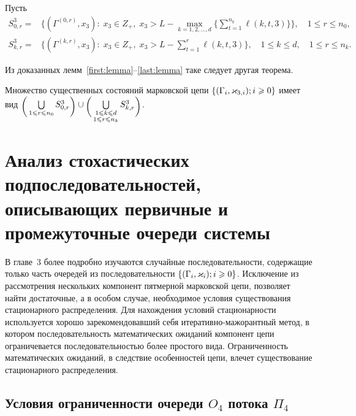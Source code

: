 \documentclass{report}
\newcommand{\Mark}{\{(\Gamma_i, \varkappa_i); \hm{} i \geqslant 0\}}
\newcommand{\MarkThree}{\{(\Gamma_i, \varkappa_{3,i}); \hm{} i \geqslant 0\}}
\begin{document}
Пусть
\begin{align*}
  S^3_{0,r} = & 
  \biggl\{
  (\Gamma^{(0,r)},x_3) \colon \; x_3\in Z_+,\; x_3 > L - \max\limits_{k=1, 2,
    \ldots, d}
  \biggl\{ \sum_{t=1}^{n_k} \ell({k,t,3}) \biggl\}\biggl\}, 
  \quad 1 \leqslant r \leqslant n_0, \\
  S^3_{k,r} = & 
  \biggl\{
  (\Gamma^{(k,r)},x_3) \colon \; x_3\in Z_+,\; x_3 > L - \sum_{t=1}^{r} \ell({k,t,3})
  \biggr\}, 
  \quad 1 \leqslant k \leqslant d, \quad 1 \leqslant r \leqslant n_k.
\end{align*}

Из доказанных лемм~\ref{first:lemma}--\ref{last:lemma} таке следует другая теорема.
\begin{theorem}
Множество существенных состояний марковской цепи $\MarkThree$ имеет вид $\raisebox{-.5ex}{$\biggl($}\bigcup\limits_{1 \leqslant r \leqslant n_0}S^3_{0,r}\raisebox{-.5ex}{$\biggr)$}\cup \raisebox{-.5ex}{$\biggl($}\bigcup\limits_{\substack{1 \leqslant k \leqslant d\\ 1 \leqslant r \leqslant n_k}} S^3_{k,r}\raisebox{-.5ex}{$\biggr)$}$.
\end{theorem}










\newpage
\section{Анализ стохастических подпоследовательностей, описывающих первичные и промежуточные очереди системы}
В главе~3 более подробно изучаются случайные последовательности, содержащие только часть очередей из последовательности $\Mark$. Исключение из рассмотрения нескольких компонент пятмерной марковской цепи, позволяет найти достаточные, а в особом случае, необходимое условия существования стационарного распределения. Для нахождения условий стационарности используется хорошо зарекомендовавший себя итеративно-мажорантный метод, в котором последовательность математических ожиданий компонент цепи ограничевается последовательностью более простого вида.
Ограниченность математических ожиданий, в следствие особенностей цепи, влечет существование стационарного распределения.

\subsection{Условия ограниченности очереди $O_4$ потока $\Pi_4$}
\end{document}
